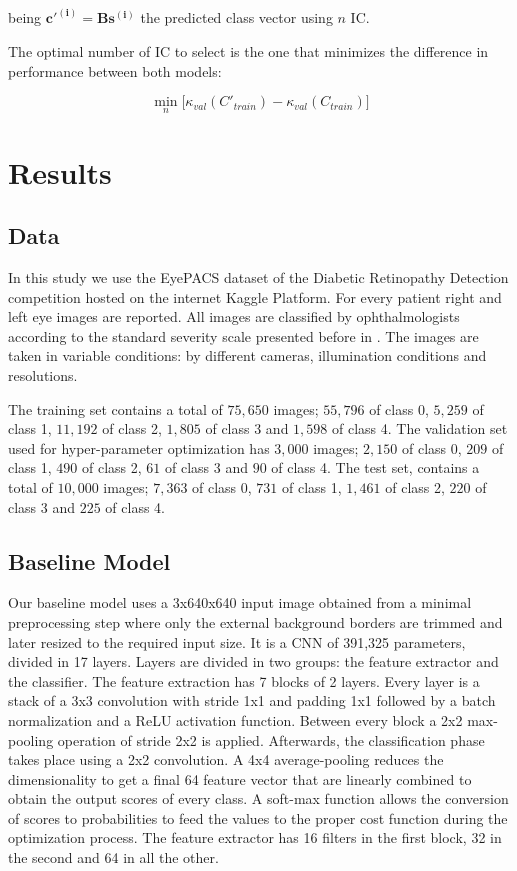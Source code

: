 \documentclass[review]{elsarticle}
\theoremstyle{definition} %
\theoremstyle{remark}
\begin{document}
being $\boldsymbol{c'^{(i)}} = \boldsymbol{B} \boldsymbol{s^{(i)}}$ the predicted class vector using $n$ IC.

The optimal number of IC to select is the one that minimizes the difference in performance between both models:

\begin{equation}
\min_{n} \big[ \kappa_{val} (C'_{train}) - \kappa_{val} (C_{train}) \big] 
\end{equation}

\section{Results}\label{sec:results}

\subsection{Data}

In this study we use the EyePACS dataset of the Diabetic Retinopathy Detection competition hosted on the internet Kaggle Platform.  For every patient right and left eye images are reported. All images are classified by ophthalmologists according to the standard severity scale presented before in \cite{diaclass}. The images are taken in variable conditions: by different cameras, illumination conditions and resolutions. 

The training set contains a total of $75,650$ images; $55,796$ of class 0, $5,259$ of class 1, $11,192$ of class 2, $1,805$ of class 3 and $1,598$ of class 4. The validation set used for hyper-parameter optimization has $3,000$ images; $2,150$ of class 0, $209$ of class 1, $490$ of class 2, $61$ of class 3 and $90$ of class 4. The test set, contains a total of $10,000$ images; $7,363$ of class 0, $731$ of class 1, $1,461$ of class 2, $220$ of class 3 and $225$ of class 4. 

\subsection{Baseline Model}

Our baseline model uses a 3x640x640 input image obtained from a minimal preprocessing step where only the external background borders are trimmed and later resized to the required input size. It is a CNN of 391,325 parameters, divided in 17 layers. Layers are divided in two groups: the feature extractor and the classifier. The feature extraction has 7 blocks of 2 layers. Every layer is a stack of a 3x3 convolution with stride 1x1 and padding 1x1 followed by a batch normalization and a ReLU activation function. Between every block a 2x2 max-pooling operation of stride 2x2 is applied.  Afterwards, the classification phase takes place using a 2x2 convolution. A 4x4 average-pooling reduces the dimensionality to get a final 64 feature vector that are linearly combined to obtain the output scores of every class. A soft-max function allows the conversion of scores to probabilities to feed the values to the proper cost function during the optimization process. The feature extractor has 16 filters in the first block, 32 in the second and 64 in all the other.
\end{document}
